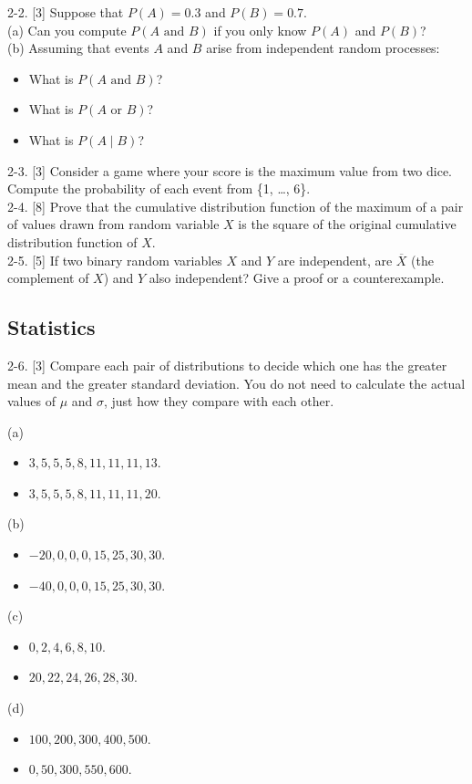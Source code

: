 \documentclass[10pt]{article}
\begin{document}
2-2. [3] Suppose that $P(A) = 0.3$ and $P(B) = 0.7$.\\
(a) Can you compute $P(A \text{ and } B)$ if you only know $P(A)$ and $P(B)$?\\
(b) Assuming that events $A$ and $B$ arise from independent random processes:
\begin{itemize}
  \item What is $P(A \text{ and } B)$?
  \item What is $P(A \text{ or } B)$?
  \item What is $P(A \mid B)$?
\end{itemize}

2-3. [3] Consider a game where your score is the maximum value from two dice. Compute the probability of each event from \{1, \ldots, 6\}.\\[0pt]

2-4. [8] Prove that the cumulative distribution function of the maximum of a pair of values drawn from random variable $X$ is the square of the original cumulative distribution function of $X$.\\[0pt]

2-5. [5] If two binary random variables $X$ and $Y$ are independent, are $\overline{X}$ (the complement of $X$) and $Y$ also independent? Give a proof or a counterexample.

\subsection{Statistics}
2-6. [3] Compare each pair of distributions to decide which one has the greater mean and the greater standard deviation. You do not need to calculate the actual values of $\mu$ and $\sigma$, just how they compare with each other.

(a)
\begin{itemize}
  \item $3, 5, 5, 5, 8, 11, 11, 11, 13$.
  \item $3, 5, 5, 5, 8, 11, 11, 11, 20$.
\end{itemize}
(b)
\begin{itemize}
  \item $-20, 0, 0, 0, 15, 25, 30, 30$.
  \item $-40, 0, 0, 0, 15, 25, 30, 30$.
\end{itemize}
(c) 
\begin{itemize}
  \item $0, 2, 4, 6, 8, 10$.
  \item $20, 22, 24, 26, 28, 30$.
\end{itemize}
(d)
\begin{itemize}
  \item $100, 200, 300, 400, 500$.
  \item $0, 50, 300, 550, 600$.
\end{itemize}
\end{document}

